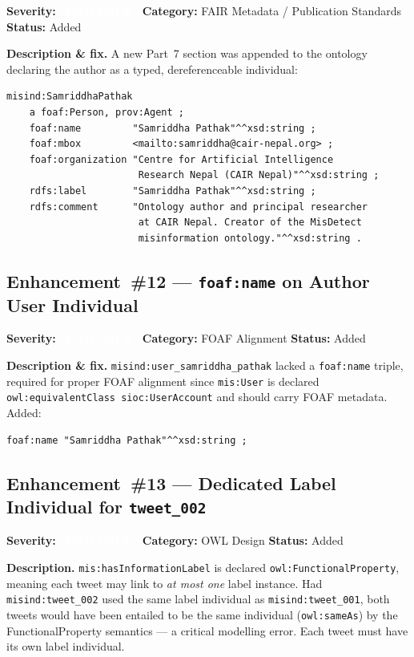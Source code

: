 \documentclass[11pt, a4paper]{article}
\newcommand{\badgeEnhancement}{\textcolor{white}{\colorbox{cair-mid}{\footnotesize\textbf{\ ENHANCE\ }}}}
\newcommand{\ind}[1]{\texttt{misind:#1}}
\begin{document}
\textbf{Severity:} \badgeEnhancement\quad
\textbf{Category:} FAIR Metadata / Publication Standards\quad
\textbf{Status:} Added

\textbf{Description \& fix.}
A new Part~7 section was appended to the ontology declaring the author as a
typed, dereferenceable individual:
\begin{lstlisting}
misind:SamriddhaPathak
    a foaf:Person, prov:Agent ;
    foaf:name         "Samriddha Pathak"^^xsd:string ;
    foaf:mbox         <mailto:samriddha@cair-nepal.org> ;
    foaf:organization "Centre for Artificial Intelligence
                       Research Nepal (CAIR Nepal)"^^xsd:string ;
    rdfs:label        "Samriddha Pathak"^^xsd:string ;
    rdfs:comment      "Ontology author and principal researcher
                       at CAIR Nepal. Creator of the MisDetect
                       misinformation ontology."^^xsd:string .
\end{lstlisting}

\subsection{Enhancement~\#12 --- \texttt{foaf:name} on Author User Individual}
\label{enh:12}

\textbf{Severity:} \badgeEnhancement\quad
\textbf{Category:} FOAF Alignment\quad
\textbf{Status:} Added

\textbf{Description \& fix.}
\ind{user\_samriddha\_pathak} lacked a \texttt{foaf:name} triple, required
for proper FOAF alignment since \texttt{mis:User} is declared
\texttt{owl:equivalentClass sioc:UserAccount} and should carry FOAF metadata.
Added:
\begin{lstlisting}
foaf:name "Samriddha Pathak"^^xsd:string ;
\end{lstlisting}

\subsection{Enhancement~\#13 --- Dedicated Label Individual for \texttt{tweet\_002}}
\label{enh:13}

\textbf{Severity:} \badgeEnhancement\quad
\textbf{Category:} OWL Design\quad
\textbf{Status:} Added

\textbf{Description.}
\texttt{mis:hasInformationLabel} is declared \texttt{owl:FunctionalProperty},
meaning each tweet may link to \emph{at most one} label instance.
Had \ind{tweet\_002} used the same label individual as \ind{tweet\_001},
both tweets would have been entailed to be the same individual
(\texttt{owl:sameAs}) by the FunctionalProperty semantics --- a critical
modelling error. Each tweet must have its own label individual.
\end{document}
